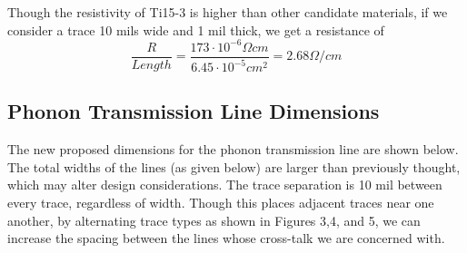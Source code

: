 \documentclass{article}
\begin{document}
Though the resistivity of Ti15-3 is higher than other candidate materials, if we consider a trace 10 mils wide and 1 mil thick, we get a resistance of
$$
\frac{R}{Length} = \frac{173 \cdot 10^{-6} \Omega cm}{6.45 \cdot 10^{-5} cm^{2}} = 2.68 \Omega / cm
$$

\subsection{Phonon Transmission Line Dimensions}

The new proposed dimensions for the phonon transmission line are shown below. The total widths of the lines (as given below) are larger than previously thought, which may alter design considerations. The trace separation is 10 mil between every trace, regardless of width. Though this places adjacent traces near one another, by alternating trace types as shown in Figures 3,4, and 5, we can increase the spacing between the lines whose cross-talk we are concerned with.
\end{document}
